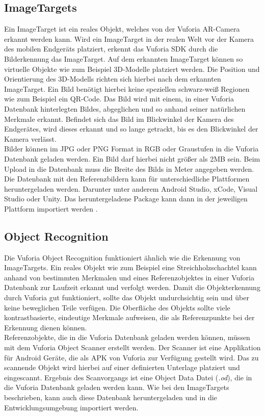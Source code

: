 \subsection{ImageTargets}
\label{sec:fund_imagetargets}
Ein ImageTarget ist ein reales Objekt, welches von der Vuforia AR-Camera erkannt werden kann. Wird ein ImageTarget in der realen Welt vor der Kamera des mobilen Endgeräts platziert, erkennt das Vuforia SDK durch die Bilderkennung das ImageTarget. Auf dem erkannten ImageTarget können so virtuelle Objekte wie zum Beispiel 3D-Modelle platziert werden. Die Position und Orientierung des 3D-Modells richten sich hierbei nach dem erkannten ImageTarget.
Ein Bild benötigt hierbei keine speziellen schwarz-weiß Regionen wie zum Beispiel ein QR-Code. Das Bild wird mit einem, in einer Vuforia Datenbank hinterlegten Bildes, abgeglichen und so anhand seiner natürlichen Merkmale erkannt. Befindet sich das Bild im Blickwinkel der Kamera des Endgerätes, wird dieses erkannt und so lange getrackt, bis es den Blickwinkel der Kamera verlässt.\\
Bilder können im JPG oder PNG Format in RGB oder Graustufen in die Vuforia Datenbank geladen werden. Ein Bild darf hierbei nicht größer als 2MB sein. Beim Upload in die Datenbank muss die Breite des Bilds in Meter angegeben werden. Die Datenbank mit den Referenzbildern kann für unterschiedliche Plattformen heruntergeladen werden. Darunter unter anderem Android Studio, xCode, Visual Studio oder Unity. Das heruntergeladene Package kann dann in der jeweiligen Plattform importiert werden \cite{VuforiaArticle} \cite{VuforiaImageTargetGuide}.

\subsection{Object Recognition}
Die Vuforia Object Recognition funktioniert ähnlich wie die Erkennung von ImageTargets. Ein reales Objekt wie zum Beispiel eine Streichholzschachtel kann anhand von bestimmten Merkmalen und eines Referenzobjektes in einer Vuforia Datenbank zur Laufzeit erkannt und verfolgt werden. Damit die Objekterkennung durch Vuforia gut funktioniert, sollte das Objekt undurchsichtig sein und über keine beweglichen Teile verfügen. Die Oberfläche des Objekts sollte viele kontrastbasierte, eindeutige Merkmale aufweisen, die als Referenzpunkte bei der Erkennung dienen können.\\
Referenzobjekte, die in die Vuforia Datenbank geladen werden können, müssen mit dem Vuforia Object Scanner \cite{VuforiaScanner} erstellt werden. Der Scanner ist eine Applikation für Android Geräte, die als APK von Vuforia zur Verfügung gestellt wird. Das zu scannende Objekt wird hierbei auf einer definierten Unterlage platziert und eingescannt. Ergebnis des Scanvorgangs ist eine Object Data Datei (\textit{.od}), die in die Vuforia Datenbank geladen werden kann. Wie bei den ImageTargets beschrieben, kann auch diese Datenbank heruntergeladen und in die Entwicklungsumgebung importiert werden.
